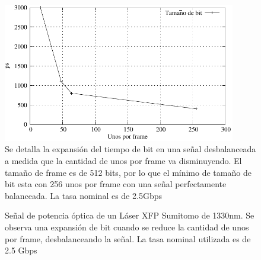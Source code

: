 \begin{figure}[t]
  \centering
    \includegraphics[width=4in]{graphs/expansionbit.pdf}
\caption {Se detalla la expansión del tiempo de bit en una señal desbalanceada a medida que la cantidad de unos por frame va disminuyendo. El tamaño de frame es de 512 bits, por lo que el mínimo de tamaño de bit esta con 256 unos por frame con una señal perfectamente balanceada. La tasa nominal es de 2.5Gbps}
\label{fig:expansionbit}
\end{figure}

\begin{figure}[!t]
   \centering
   \qquad
   \qquad
  \caption {Señal de potencia óptica de un Láser XFP Sumitomo de 1330nm. Se observa una expansión de bit cuando se reduce la cantidad de unos por frame, desbalanceando la señal. La tasa nominal utilizada es de 2.5 Gbps}
  \label{fig:ImgExpansion}
\end{figure}

